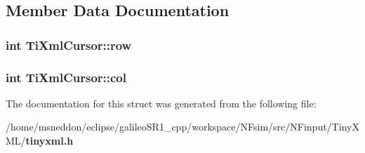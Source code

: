 \subsection{Member Data Documentation}
\subsubsection{\setlength{\rightskip}{0pt plus 5cm}int {\bf TiXmlCursor::row}}\label{structTiXmlCursor_5b54dd949820c2db061e2be41f3effb3}


\subsubsection{\setlength{\rightskip}{0pt plus 5cm}int {\bf TiXmlCursor::col}}\label{structTiXmlCursor_5694d7ed2c4d20109d350c14c417969d}




The documentation for this struct was generated from the following file:\begin{CompactItemize}
\item 
/home/msneddon/eclipse/galileoSR1\_\-cpp/workspace/NFsim/src/NFinput/TinyXML/{\bf tinyxml.h}\end{CompactItemize}
